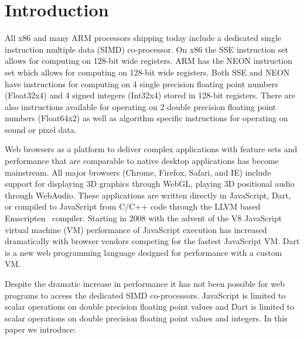 \documentclass[preprint]{sigplanconf}
\begin{document}
\section{Introduction}
All x86 and many ARM processors shipping today include a
dedicated single instruction multiple data (SIMD) co-processor.  On x86 the SSE
instruction set allows for computing on 128-bit wide registers. ARM has the NEON
instruction set which allows for computing on 128-bit wide registers. Both SSE
and NEON have instructions for computing on 4 single precision floating point
numbers (Float32x4) and 4 signed integers (Int32x4) stored in 128-bit registers.
There are also instructions available for operating on 2 double precision
floating point numbers (Float64x2) as well as algorithm specific instructions
for operating on sound or pixel data.

Web browsers as a platform to deliver complex applications with feature sets and
performance that are comparable to native desktop applications has become
mainstream. All major browsers (Chrome, Firefox, Safari, and IE) include support
for displaying 3D graphics through WebGL, playing 3D positional audio through
WebAudio. These applications are written directly in JavaScript, Dart, or
compiled to JavaScript from C/C++ code through the LLVM based
Emscripten~\cite{emscripten} compiler. Starting in 2008 with the advent of the
V8 JavaScript virtual machine (VM) performance of JavaScript execution has
increased dramatically with browser vendors competing for the fastest JavaScript
VM. Dart is a new web programming language designed for performance with a
custom VM.

Despite the dramatic increase in performance it has not been possible for web
programs to access the dedicated SIMD co-processors. JavaScript is limited to
scalar operations on double precision floating point values and Dart is limited
to scalar operations on double precision floating point values and integers. In
this paper we introduce:
\end{document}
